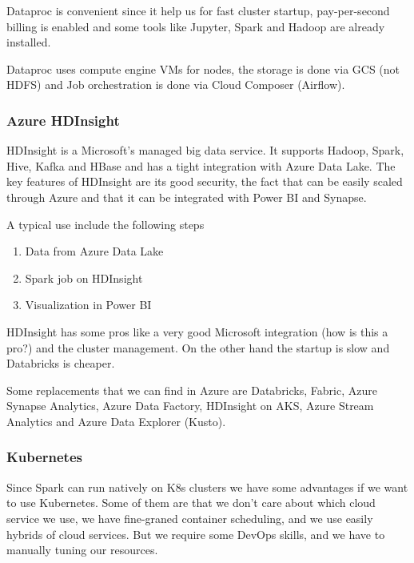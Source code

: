 Dataproc is convenient since it help us for fast cluster startup, pay-per-second billing is enabled and some tools like Jupyter, Spark and Hadoop are already installed.

\vspace{10pt}

Dataproc uses compute engine VMs for nodes, the storage is done via GCS (not HDFS) and Job orchestration is done via Cloud Composer (Airflow).



\subsubsection{Azure HDInsight}

HDInsight is a Microsoft's managed big data service. It supports Hadoop, Spark, Hive, Kafka and HBase and has a tight integration with Azure Data Lake. The key features of HDInsight are its good security, the fact that can be easily scaled through Azure and that it can be integrated with Power BI and Synapse.

\vspace{10pt}

A typical use include the following steps

\begin{enumerate}
    \item Data from Azure Data Lake
    \item Spark job on HDInsight
    \item Visualization in Power BI
\end{enumerate}


HDInsight has some pros like a very good Microsoft integration (how is this a pro?) and the cluster management. On the other hand the startup is slow and Databricks is cheaper. 

Some replacements that we can find in Azure are Databricks, Fabric, Azure Synapse Analytics, Azure Data Factory, HDInsight on AKS, Azure Stream Analytics and Azure Data Explorer (Kusto).



\subsubsection{Kubernetes}

Since Spark can run natively on K8s clusters we have some advantages if we want to use Kubernetes. Some of them are that we don't care about which cloud service we use, we have fine-graned container scheduling, and we use easily hybrids of cloud services. But we require some DevOps skills, and we have to manually tuning our resources. 


